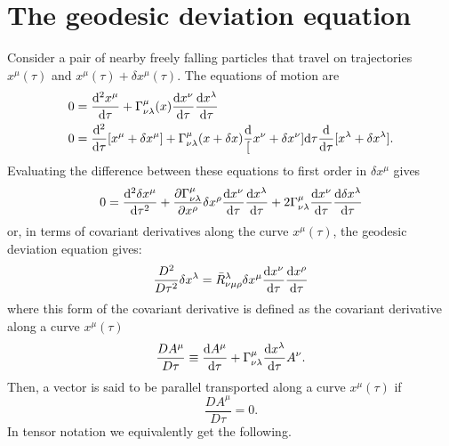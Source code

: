 \section{The geodesic deviation equation}
Consider a pair of nearby freely falling particles that travel on trajectories $x^\mu(\tau)$ and $x^\mu(\tau)+\delta x^\mu(\tau)$. The equations of motion are
\begin{align*}
	0&= \frac{\mathrm{d}^2 x^\mu}{\mathrm{d} \tau} +  \Gamma^\mu_{\nu\lambda}(x)\frac{\mathrm{d} x^\nu}{\mathrm{d} \tau} \frac{\mathrm{d} x^\lambda}{\mathrm{d} \tau}\\
	0&=\frac{\mathrm{d}^2 }{\mathrm{d} \tau} [x^\mu+\delta x^\mu]+  \Gamma^\mu_{\nu\lambda}(x+\delta x)\frac{\mathrm{d} } [x^\nu +\delta x^\nu]{\mathrm{d}\tau} \frac{\mathrm{d} }{\mathrm{d} \tau}[x^\lambda + \delta x^\lambda].
\end{align*}
Evaluating the difference between these equations to first order in $\delta x^\mu$ gives
\begin{equation}
	0= \frac{\mathrm{d}^2 \delta x^\mu}{\mathrm{d} \tau^2} + \frac{\partial \Gamma^\mu_{\nu\lambda}}{\partial x^\rho} \delta x^\rho \frac{\mathrm{d} x^\nu}{\mathrm{d} \tau} \frac{\mathrm{d} x^\lambda}{\mathrm{d} \tau} + 2 \Gamma^\mu_{\nu \lambda} \frac{\mathrm{d} x^\nu}{\mathrm{d} \tau} \frac{\mathrm{d} \delta x^\lambda}{\mathrm{d} \tau}
\end{equation}
or, in terms of covariant derivatives along the curve $x^\mu(\tau)$, the geodesic deviation equation gives:
\begin{equation}
	\frac{D^2}{D \tau^2} \delta x^\lambda = \bar{R}^\lambda_{\nu \mu \rho} \delta x^\mu \frac{\mathrm{d} x^\nu}{\mathrm{d} \tau} \frac{\mathrm{d} x^\rho}{\mathrm{d} \tau}
\end{equation}
where this form of the covariant derivative is defined as the covariant derivative along a curve $x^\mu(\tau)$ 
\begin{equation}
	\frac{D A^\mu}{D \tau} \equiv \frac{\mathrm{d} A^\mu}{\mathrm{d} \tau} + \Gamma^\mu_{\nu\lambda} \frac{\mathrm{d} x^\lambda}{\mathrm{d} \tau} A^\nu.
\end{equation}
Then, a vector is said to be parallel transported along a curve $x^\mu(\tau)$ if 
\begin{equation}
\frac{D A^\mu}{D \tau} =0.
\end{equation}
In tensor notation we equivalently get the following.

